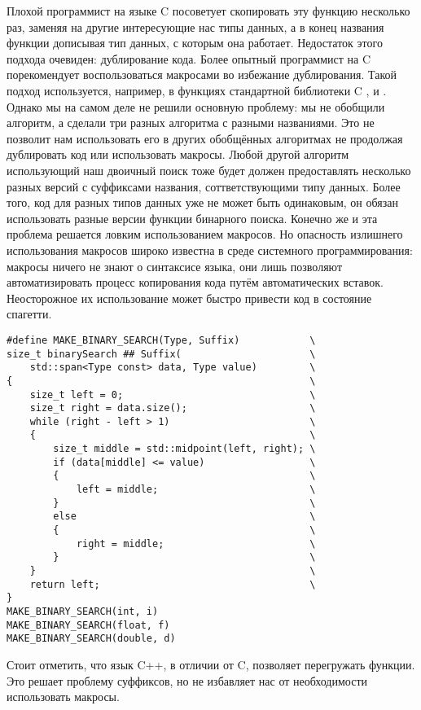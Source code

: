 Плохой программист на языке C посоветует скопировать эту функцию несколько раз, заменяя  на другие интересующие нас типы данных, а в конец названия функции дописывая тип данных, с которым она работает. Недостаток этого подхода очевиден: дублирование кода. Более опытный программист на C порекомендует воспользоваться макросами во избежание дублирования. Такой подход используется, например, в функциях стандартной библиотеки C ,  и . Однако мы на самом деле не решили основную проблему: мы не обобщили алгоритм, а сделали три разных алгоритма с разными названиями. Это не позволит нам использовать его в других обобщённых алгоритмах не продолжая дублировать код или использовать макросы. Любой другой алгоритм использующий наш двоичный поиск тоже будет должен предоставлять несколько разных версий с суффиксами названия, соттветствующими типу данных. Более того, код для разных типов данных уже не может быть одинаковым, он обязан использовать разные версии функции бинарного поиска. Конечно же и эта проблема решается ловким использованием макросов. Но опасность излишнего использования макросов широко известна в среде системного программирования: макросы ничего не знают о синтаксисе языка, они лишь позволяют автоматизировать процесс копирования кода путём автоматических вставок. Неосторожное их использование может быстро привести код в состояние спагетти.
\begin{verbatim}
#define MAKE_BINARY_SEARCH(Type, Suffix)            \
size_t binarySearch ## Suffix(                      \
    std::span<Type const> data, Type value)         \
{                                                   \
    size_t left = 0;                                \
    size_t right = data.size();                     \
    while (right - left > 1)                        \
    {                                               \
        size_t middle = std::midpoint(left, right); \
        if (data[middle] <= value)                  \
        {                                           \
            left = middle;                          \
        }                                           \
        else                                        \
        {                                           \
            right = middle;                         \
        }                                           \
    }                                               \
    return left;                                    \
}
MAKE_BINARY_SEARCH(int, i)
MAKE_BINARY_SEARCH(float, f)
MAKE_BINARY_SEARCH(double, d)
\end{verbatim}
Стоит отметить, что язык C++, в отличии от C, позволяет перегружать функции. Это решает проблему суффиксов, но не избавляет нас от необходимости использовать макросы.

